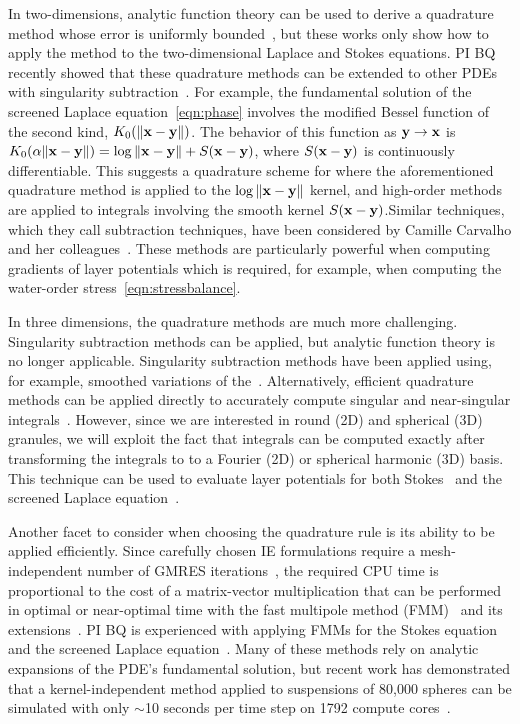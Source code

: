 In two-dimensions, analytic function theory can be used to derive a
quadrature method whose error is uniformly bounded~\cite{bar2014,
bar-wu-vee2015, ioa-pap-per1991}, but these works only show how to apply
the method to the two-dimensional Laplace and Stokes equations. PI BQ
recently showed that these quadrature methods can be extended to other
PDEs with singularity subtraction~\cite{che-lin-her-qua2022}. For
example, the fundamental solution of the screened Laplace
equation~\eqref{eqn:phase} involves the modified Bessel function of the
second kind, $K_0(\|\mathbf{x} - \mathbf{y}\|)$. The behavior of this function as $\mathbf{y}
\rightarrow \mathbf{x}$ is $K_0(\alpha \|\mathbf{x} - \mathbf{y}\|) = \log\|\mathbf{x} - \mathbf{y}\| +
S(\mathbf{x} - \mathbf{y})$, where $S(\mathbf{x} - \mathbf{y})$ is continuously differentiable. This
suggests a quadrature scheme for where the aforementioned quadrature
method is applied to the $\log\|\mathbf{x} - \mathbf{y}\|$ kernel, and high-order
methods~\cite{tre-wei2014} are applied to integrals involving the smooth
kernel $S(\mathbf{x} - \mathbf{y})$.Similar techniques, which they call subtraction
techniques, have been considered by Camille Carvalho and her
colleagues~\cite{car2021, car2020, car-kha-kim2018}.  These methods are
particularly powerful when computing gradients of layer potentials which
is required, for example, when computing the water-order
stress~\eqref{eqn:stressbalance}.

In three dimensions, the quadrature methods are much more challenging.
Singularity subtraction methods can be applied, but analytic function
theory is no longer applicable. Singularity subtraction methods have
been applied using, for example, smoothed variations of
the~\cite{beale1, cor2001, tlu-bea2019}. Alternatively, efficient
quadrature methods can be applied directly to accurately compute
singular and near-singular integrals~\cite{khayat_2005,
gimbutas2013sisc}. However, since we are interested in round (2D) and
spherical (3D) granules, we will exploit the fact that integrals can be
computed exactly after transforming the integrals to to a Fourier (2D)
or spherical harmonic (3D) basis. This technique can be used to evaluate
layer potentials for both Stokes~\cite{cor-vee2018} and the screened
Laplace equation~\cite{koh-cor-che-vee2021}.

Another facet to consider when choosing the quadrature rule is its
ability to be applied efficiently. Since carefully chosen IE
formulations require a mesh-independent number of GMRES
iterations~\cite{cam-ips-kel-mey-xue1996}, the required CPU time is
proportional to the cost of a matrix-vector multiplication that can be
performed in optimal or near-optimal time with the fast multipole method
(FMM)~\cite{fmm5} and its extensions~\cite{fmm1, fmm2, fmm3, fmm4, fmm6,
fmm7, ros-ols2016}. PI BQ is experienced with applying FMMs for the
Stokes equation~\cite{qua-bir2014, bys-sha-qua2020} and the screened
Laplace equation~\cite{kro-qua2011, qua2011}. Many of these methods rely
on analytic expansions of the PDE's fundamental solution, but recent
work has demonstrated that a kernel-independent method applied to
suspensions of 80,000 spheres can be simulated with only $\sim$10
seconds per time step on 1792 compute cores~\cite{Yan2019}.


